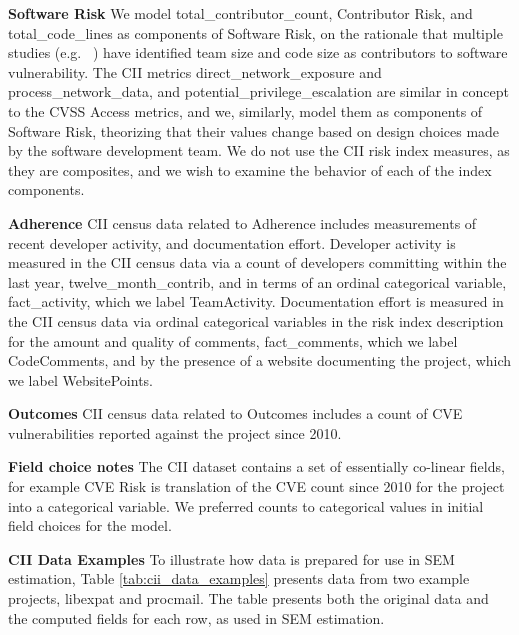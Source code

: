 \textbf{Software Risk}
We model total\_contributor\_count, Contributor Risk, and total\_code\_lines as components of Software Risk, on the rationale that multiple studies (e.g. ~\cite{camilo2015do,dashevskyi2016on}) have identified team size and code size as contributors to software vulnerability. The CII metrics direct\_network\_exposure and process\_network\_data, and potential\_privilege\_escalation are similar in concept to the CVSS Access metrics, and we, similarly, model them as components of Software Risk, theorizing that their values change based on design choices made by the software development team. We do not use the CII risk index measures, as they are composites, and we wish to examine the behavior of each of the index components.

\textbf{Adherence}
CII census data related to Adherence includes measurements of recent developer activity, and documentation effort. Developer activity is measured in the CII census data via a count of developers committing within the last year, twelve\_month\_contrib, and in terms of an ordinal categorical variable, fact\_activity, which we label TeamActivity. Documentation effort is measured in the CII census data via ordinal categorical variables in the risk index description for the amount and quality of comments, fact\_comments, which we label CodeComments, and by the presence of a website documenting the project, which we label WebsitePoints.

\textbf{Outcomes}
CII census data related to Outcomes includes a count of CVE vulnerabilities reported against the project since 2010. 

\textbf{Field choice notes}
The CII dataset contains a set of essentially co-linear fields, for example CVE Risk is translation of the CVE count since 2010 for the project into a categorical variable. We preferred counts to categorical values in initial field choices for the model.

\textbf{CII Data Examples}
To illustrate how data is prepared for use in SEM estimation, Table \ref{tab:cii_data_examples} presents data from two example projects, libexpat and procmail.  The table presents both the original data and the computed fields for each row, as used in SEM estimation.

